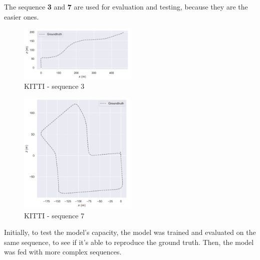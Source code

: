 The sequence \textbf{3} and \textbf{7} are used for evaluation and testing, because they are the easier ones.
\begin{figure}[H]
    \centering
    \includegraphics[width=0.5\textwidth]{images/3_1_kitti_seq_3}
    \caption{KITTI - sequence 3}\label{fig:kitti-seq-3}
\end{figure}
\begin{figure}[H]
    \centering
    \includegraphics[width=0.5\textwidth]{images/3_1_kitti_seq_7}
    \caption{KITTI - sequence 7}\label{fig:kitti-seq-7}
\end{figure}

Initially, to test the model's capacity, the model was trained and evaluated on the same sequence, to see if it's able to reproduce the ground truth.
Then, the model was fed with more complex sequences.